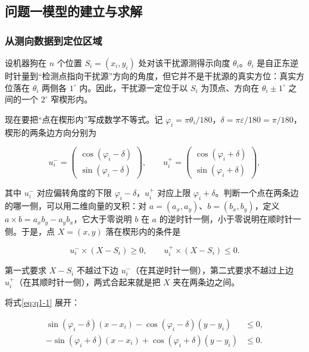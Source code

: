 \subsection{问题一模型的建立与求解}\label{sec:q1}
\subsubsection{从测向数据到定位区域}\label{sec:q1-1}

设机器狗在 $n$ 个位置 $S_i=(x_i,y_i)$ 处对该干扰源测得示向度 $\theta_i$。$\theta_i$ 是自正东逆时针量到“检测点指向干扰源”方向的角度，但它并不是干扰源的真实方位：真实方位落在 $\theta_i$ 两侧各 $1^\circ$ 内。因此，干扰源一定位于以 $S_i$ 为顶点、方向在 $\theta_i\pm1^\circ$ 之间的一个 $2^\circ$ 窄楔形内。

现在要把“点在楔形内”写成数学不等式。记 $\varphi_i=\pi\theta_i/180$，$\delta=\pi\varepsilon/180=\pi/180$，楔形的两条边方向分别为

\[
u_i^-=\begin{pmatrix}\cos(\varphi_i-\delta)\\ \sin(\varphi_i-\delta)\end{pmatrix},\qquad
u_i^+=\begin{pmatrix}\cos(\varphi_i+\delta)\\ \sin(\varphi_i+\delta)\end{pmatrix},
\]

其中 $u_i^-$ 对应偏转角度的下限 $\varphi_i-\delta$，$u_i^+$ 对应上限 $\varphi_i+\delta$。判断一个点在两条边的哪一侧，可以用二维向量的叉积：对 $a=(a_x,a_y)$、$b=(b_x,b_y)$，定义 $a\times b=a_xb_y-a_yb_x$，它大于零说明 $b$ 在 $a$ 的逆时针一侧，小于零说明在顺时针一侧。于是，点 $X=(x,y)$ 落在楔形内的条件是

\begin{equation}\label{eq:q1-1}
u_i^-\times(X-S_i)\ge 0,\qquad u_i^+\times(X-S_i)\le 0.
\end{equation}

第一式要求 $X-S_i$ 不越过下边 $u_i^-$（在其逆时针一侧），第二式要求不越过上边 $u_i^+$（在其顺时针一侧），两式合起来就是把 $X$ 夹在两条边之间。

将式\eqref{eq:q1-1} 展开：

\begin{equation}\label{eq:q1-2}
\begin{aligned}
\sin(\varphi_i-\delta)(x-x_i)-\cos(\varphi_i-\delta)(y-y_i)&\le 0,\\
-\sin(\varphi_i+\delta)(x-x_i)+\cos(\varphi_i+\delta)(y-y_i)&\le 0.
\end{aligned}
\end{equation}

